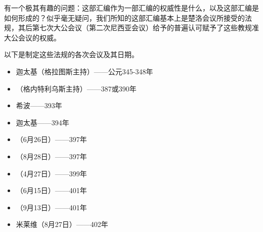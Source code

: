 有一个极其有趣的问题：这部汇编作为一部汇编的权威性是什么，以及这部汇编是如何形成的？似乎毫无疑问，我们所知的这部汇编基本上是楚洛会议所接受的法规，其后第七次大公会议（第二次尼西亚会议）给予的普遍认可赋予了这些教规准大公会议的权威。\par

以下是制定这些法规的各次会议及其日期。\par

\begin{itemize}
\item 迦太基（格拉图斯主持）——公元345-348年
\end{itemize}

\begin{itemize}
\item （格内特利乌斯主持）——387或390年
\end{itemize}

\begin{itemize}
\item 希波——393年
\end{itemize}

\begin{itemize}
\item 迦太基——394年
\end{itemize}

\begin{itemize}
\item （6月26日）——397年
\end{itemize}

\begin{itemize}
\item （8月28日）——397年
\end{itemize}

\begin{itemize}
\item （4月27日）——399年
\end{itemize}

\begin{itemize}
\item （6月15日）——401年
\end{itemize}

\begin{itemize}
\item （9月13日）——401年
\end{itemize}

\begin{itemize}
\item 米莱维（8月27日）——402年
\end{itemize}

